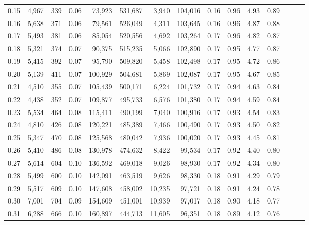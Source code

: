 \begin{tabular}{rrrrrrrrrrrrrrr}
0.15 &   4,967 &    339 &  0.06 &   73,923 &  531,687 &    3,940 &  104,016 &  0.16 &  0.96 &  4.93 &      0.89 \\
0.16 &   5,638 &    371 &  0.06 &   79,561 &  526,049 &    4,311 &  103,645 &  0.16 &  0.96 &  4.87 &      0.88 \\
0.17 &   5,493 &    381 &  0.06 &   85,054 &  520,556 &    4,692 &  103,264 &  0.17 &  0.96 &  4.82 &      0.87 \\
0.18 &   5,321 &    374 &  0.07 &   90,375 &  515,235 &    5,066 &  102,890 &  0.17 &  0.95 &  4.77 &      0.87 \\
0.19 &   5,415 &    392 &  0.07 &   95,790 &  509,820 &    5,458 &  102,498 &  0.17 &  0.95 &  4.72 &      0.86 \\
0.20 &   5,139 &    411 &  0.07 &  100,929 &  504,681 &    5,869 &  102,087 &  0.17 &  0.95 &  4.67 &      0.85 \\
0.21 &   4,510 &    355 &  0.07 &  105,439 &  500,171 &    6,224 &  101,732 &  0.17 &  0.94 &  4.63 &      0.84 \\
0.22 &   4,438 &    352 &  0.07 &  109,877 &  495,733 &    6,576 &  101,380 &  0.17 &  0.94 &  4.59 &      0.84 \\
0.23 &   5,534 &    464 &  0.08 &  115,411 &  490,199 &    7,040 &  100,916 &  0.17 &  0.93 &  4.54 &      0.83 \\
0.24 &   4,810 &    426 &  0.08 &  120,221 &  485,389 &    7,466 &  100,490 &  0.17 &  0.93 &  4.50 &      0.82 \\
0.25 &   5,347 &    470 &  0.08 &  125,568 &  480,042 &    7,936 &  100,020 &  0.17 &  0.93 &  4.45 &      0.81 \\
0.26 &   5,410 &    486 &  0.08 &  130,978 &  474,632 &    8,422 &   99,534 &  0.17 &  0.92 &  4.40 &      0.80 \\
0.27 &   5,614 &    604 &  0.10 &  136,592 &  469,018 &    9,026 &   98,930 &  0.17 &  0.92 &  4.34 &      0.80 \\
0.28 &   5,499 &    600 &  0.10 &  142,091 &  463,519 &    9,626 &   98,330 &  0.18 &  0.91 &  4.29 &      0.79 \\
0.29 &   5,517 &    609 &  0.10 &  147,608 &  458,002 &   10,235 &   97,721 &  0.18 &  0.91 &  4.24 &      0.78 \\
0.30 &   7,001 &    704 &  0.09 &  154,609 &  451,001 &   10,939 &   97,017 &  0.18 &  0.90 &  4.18 &      0.77 \\
0.31 &   6,288 &    666 &  0.10 &  160,897 &  444,713 &   11,605 &   96,351 &  0.18 &  0.89 &  4.12 &      0.76 \\

\end{tabular}

